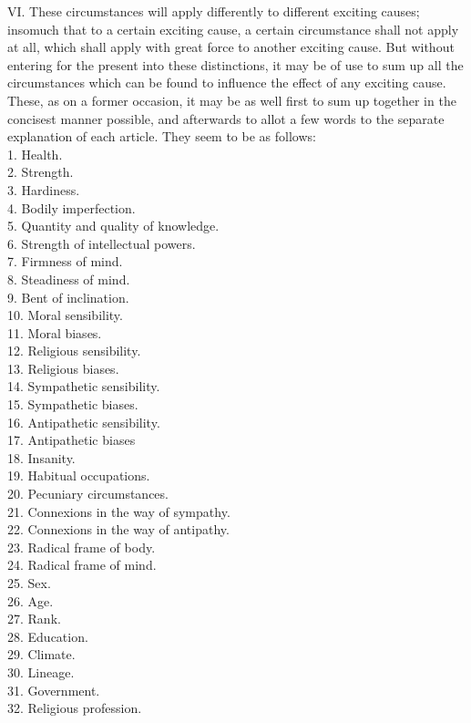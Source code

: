 \documentclass[12pt]{report}
\begin{document}
VI. These circumstances will apply differently to different exciting
causes; insomuch that to a certain exciting cause, a certain
circumstance shall not apply at all, which shall apply with great force
to another exciting cause. But without entering for the present into
these distinctions, it may be of use to sum up all the circumstances
which can be found to influence the effect of any exciting cause. These,
as on a former occasion, it may be as well first to sum up together in
the concisest manner possible, and afterwards to allot a few words to
the separate explanation of each article. They seem to be as follows:\\
1. Health.\\
2. Strength.\\
3. Hardiness.\\
4. Bodily imperfection.\\
5. Quantity and quality of knowledge.\\
6. Strength of intellectual powers.\\
7. Firmness of mind.\\
8. Steadiness of mind.\\
9. Bent of inclination.\\
10. Moral sensibility.\\
11. Moral biases.\\
12. Religious sensibility.\\
13. Religious biases.\\
14. Sympathetic sensibility.\\
15. Sympathetic biases.\\
16. Antipathetic sensibility.\\
17. Antipathetic biases\\
18. Insanity.\\
19. Habitual occupations.\\
20. Pecuniary circumstances.\\
21. Connexions in the way of sympathy.\\
22. Connexions in the way of antipathy.\\
23. Radical frame of body.\\
24. Radical frame of mind.\\
25. Sex.\\
26. Age.\\
27. Rank.\\
28. Education.\\
29. Climate.\\
30. Lineage.\\
31. Government.\\
32. Religious profession.
\end{document}
